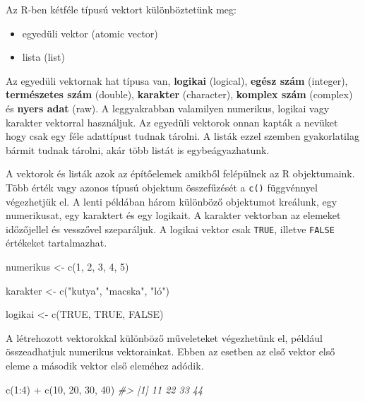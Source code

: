 \documentclass[
]{book}
\newenvironment{Shaded}{\begin{snugshade}}{\end{snugshade}}
\newcommand{\CommentTok}[1]{\textcolor[rgb]{0.56,0.35,0.01}{\textit{#1}}}
\newcommand{\ConstantTok}[1]{\textcolor[rgb]{0.00,0.00,0.00}{#1}}
\newcommand{\DecValTok}[1]{\textcolor[rgb]{0.00,0.00,0.81}{#1}}
\newcommand{\FunctionTok}[1]{\textcolor[rgb]{0.00,0.00,0.00}{#1}}
\newcommand{\NormalTok}[1]{#1}
\newcommand{\OtherTok}[1]{\textcolor[rgb]{0.56,0.35,0.01}{#1}}
\newcommand{\SpecialCharTok}[1]{\textcolor[rgb]{0.00,0.00,0.00}{#1}}
\newcommand{\StringTok}[1]{\textcolor[rgb]{0.31,0.60,0.02}{#1}}
\providecommand{\tightlist}{%
  \setlength{\itemsep}{0pt}\setlength{\parskip}{0pt}}
\begin{document}
Az R-ben kétféle típusú vektort különböztetünk meg:

\begin{itemize}
\tightlist
\item
  egyedüli vektor (atomic vector)
\item
  lista (list)
\end{itemize}

Az egyedüli vektornak hat típusa van, \textbf{logikai} (logical),
\textbf{egész szám} (integer), \textbf{természetes szám} (double),
\textbf{karakter} (character), \textbf{komplex szám} (complex) és
\textbf{nyers adat} (raw). A leggyakrabban valamilyen numerikus, logikai
vagy karakter vektorral használjuk. Az egyedüli vektorok onnan kapták a
nevüket hogy csak egy féle adattípust tudnak tárolni. A listák ezzel
szemben gyakorlatilag bármit tudnak tárolni, akár több listát is
egybeágyazhatunk.

A vektorok és listák azok az építőelemek amikből felépülnek az R
objektumaink. Több érték vagy azonos típusú objektum összefűzését a
\texttt{c()} függvénnyel végezhetjük el. A lenti példában három
különböző objektumot kreálunk, egy numerikusat, egy karaktert és egy
logikait. A karakter vektorban az elemeket időzőjellel és vesszővel
szeparáljuk. A logikai vektor csak \texttt{TRUE}, illetve \texttt{FALSE}
értékeket tartalmazhat.

\begin{Shaded}
\begin{Highlighting}[]
\NormalTok{numerikus }\OtherTok{\textless{}{-}} \FunctionTok{c}\NormalTok{(}\DecValTok{1}\NormalTok{, }\DecValTok{2}\NormalTok{, }\DecValTok{3}\NormalTok{, }\DecValTok{4}\NormalTok{, }\DecValTok{5}\NormalTok{)}

\NormalTok{karakter }\OtherTok{\textless{}{-}} \FunctionTok{c}\NormalTok{(}\StringTok{"kutya"}\NormalTok{, }\StringTok{"macska"}\NormalTok{, }\StringTok{"ló"}\NormalTok{)}

\NormalTok{logikai }\OtherTok{\textless{}{-}} \FunctionTok{c}\NormalTok{(}\ConstantTok{TRUE}\NormalTok{, }\ConstantTok{TRUE}\NormalTok{, }\ConstantTok{FALSE}\NormalTok{)}
\end{Highlighting}
\end{Shaded}

A létrehozott vektorokkal különböző műveleteket végezhetünk el, például
összeadhatjuk numerikus vektorainkat. Ebben az esetben az első vektor
első eleme a második vektor első eleméhez adódik.

\begin{Shaded}
\begin{Highlighting}[]
\FunctionTok{c}\NormalTok{(}\DecValTok{1}\SpecialCharTok{:}\DecValTok{4}\NormalTok{) }\SpecialCharTok{+} \FunctionTok{c}\NormalTok{(}\DecValTok{10}\NormalTok{, }\DecValTok{20}\NormalTok{, }\DecValTok{30}\NormalTok{, }\DecValTok{40}\NormalTok{)}
\CommentTok{\#\textgreater{} [1] 11 22 33 44}
\end{Highlighting}
\end{Shaded}
\end{document}
